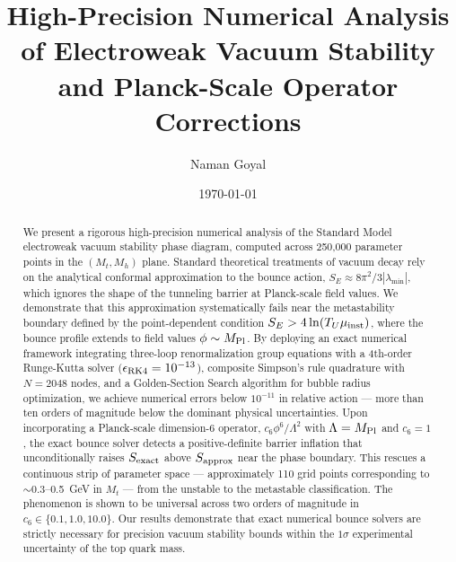 \documentclass[aps,prd,twocolumn,superscriptaddress,nofootinbib]{revtex4-2}
\begin{document}
\title{High-Precision Numerical Analysis of Electroweak Vacuum Stability\\
and Planck-Scale Operator Corrections}

\author{Naman Goyal}

\date{\today}

\begin{abstract}
We present a rigorous high-precision numerical analysis of the Standard Model
electroweak vacuum stability phase diagram, computed across 250,000 parameter
points in the $(M_t, M_h)$ plane. Standard theoretical treatments of vacuum
decay rely on the analytical conformal approximation to the bounce action,
$S_E \approx 8\pi^2/3|\lambda_{\min}|$, which ignores the shape of the
tunneling barrier at Planck-scale field values. We demonstrate that this
approximation systematically fails near the metastability boundary
defined by the point-dependent condition $S_E > 4\ln(T_U\mu_{\rm inst})$,
where the bounce profile extends to field values
$\phi \sim M_{\rm Pl}$. By deploying an exact numerical framework
integrating three-loop renormalization group equations with a
4th-order Runge-Kutta solver ($\epsilon_{\rm RK4} = 10^{-13}$),
composite Simpson's rule quadrature with $N = 2048$ nodes, and a Golden-Section
Search algorithm for bubble radius optimization, we achieve numerical errors
below $10^{-11}$ in relative action — more than ten orders of magnitude
below the dominant physical uncertainties. Upon incorporating a Planck-scale
dimension-6 operator, $c_6 \phi^6/\Lambda^2$ with $\Lambda = M_{\rm Pl}$
and $c_6 = 1$, the exact bounce solver detects a positive-definite barrier
inflation that unconditionally raises $S_{\rm exact}$ above $S_{\rm approx}$
near the phase boundary. This rescues a continuous strip of parameter space —
approximately 110 grid points corresponding to $\sim$0.3--0.5~GeV in $M_t$
— from the unstable to the metastable classification. The phenomenon is shown
to be universal across two orders of magnitude in $c_6 \in \{0.1, 1.0, 10.0\}$.
Our results demonstrate that exact numerical bounce solvers are strictly
necessary for precision vacuum stability bounds within the $1\sigma$
experimental uncertainty of the top quark mass.
\end{abstract}

\maketitle
\end{document}
